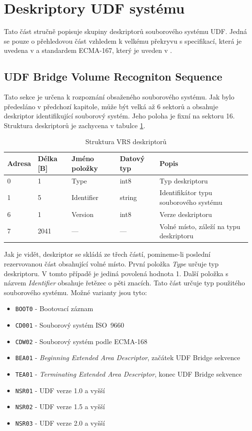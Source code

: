 \section{Deskriptory UDF systému}
Tato část stručně popisuje skupiny deskriptorů souborového systému UDF. Jedná se pouze o přehledovou část vzhledem k velkému překryvu s specifikací, která je uvedena v \cite{osta-udf-0201} a standardem ECMA-167, který je uveden v \cite{ecma-167}.

\subsection{UDF Bridge Volume Recogniton Sequence}
\label{sec:vrs}
Tato sekce je určena k rozpoznání obsaženého souborového systému. Jak bylo předesláno v předchozí kapitole, může být velká až 6 sektorů a obsahuje deskriptor identifikující souborový systém. Jeho poloha je fixní na sektoru 16.\\
Struktura deskriptorů je zachycena v tabulce \ref{tab:vrs}.
\begin{table}
    \begin{tabular}{ | l | l | l | l | l | }
        \hline
        Adresa  & Délka [B]   & Jméno položky & Datový typ    & Popis \\ \hline
        0       & 1             & Type           & int8          & Typ deskriptoru \\ \hline
        1       & 5             & Identifier & string        & Identifikátor typu souborového systému \\ \hline
        6       & 1             & Version         & int8          & Verze deskriptoru \\ \hline
        7       & 2041          & ---           & ---           & Volné místo, záleží na typu deskriptoru \\ \hline
    \end{tabular}
    \caption{Struktura VRS deskriptorů\label{tab:vrs}}
\end{table}
Jak je vidět, deskriptor se skládá ze třech částí, pomineme-li poslední rezervovanou část obsahující volné místo. První položka \textit{Type} určuje typ deskriptoru. V tomto případě je jediná povolená hodnota 1. Další položka s názvem \textit{Identifier} obsahuje řetězec o pěti znacích. Tato část určuje typ použitého souborového systému. Možné varianty jsou tyto:
\begin{itemize}
    \item \texttt{BOOT0} - Bootovací záznam
    \item \texttt{CD001} - Souborový systém ISO~9660
    \item \texttt{CDW02} - Souborový systém podle ECMA-168
    \item \texttt{BEA01} - \textit{Beginning Extended Area Descriptor}, začátek UDF Bridge sekvence
    \item \texttt{TEA01} - \textit{Terminating Extended Area Descriptor}, konec UDF Bridge sekvence
    \item \texttt{NSR01} - UDF verze 1.0 a vyšší
    \item \texttt{NSR02} - UDF verze 1.5 a vyšší
    \item \texttt{NSR03} - UDF verze 2.0 a vyšší
\end{itemize}
